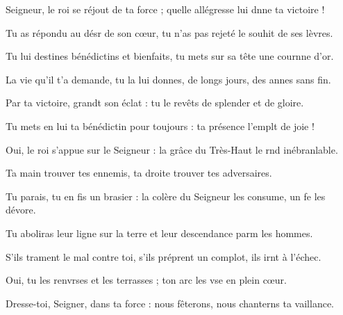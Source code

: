 \item Seigneur, le roi se réjout de ta force ;\psstar{} quelle allégresse lui dnne ta victoire !
\item Tu as répondu au désr de son cœur,\psstar{} tu n’as pas rejeté le souhit de ses lèvres.
\item Tu lui destines bénédictins et bienfaits,\psstar{} tu mets sur sa tête une cournne d’or.
\item La vie qu’il t’a demande, tu la lui donnes,\psstar{} de longs jours, des annes sans fin.
\item Par ta victoire, grandt son éclat :\psstar{} tu le revêts de splender et de gloire.
\item Tu mets en lui ta bénédictin pour toujours :\psstar{} ta présence l’emplt de joie !
\item Oui, le roi s’appue sur le Seigneur :\psstar{} la grâce du Très-Haut le rnd inébranlable.
\item Ta main trouver tes ennemis,\psstar{} ta droite trouver tes adversaires.
\item Tu parais, tu en fis un brasier :\psstar{} la colère du Seigneur les consume, un fe les dévore.
\item Tu aboliras leur ligne sur la terre\psstar{} et leur descendance parm les hommes.
\item S’ils trament le mal contre toi, s’ils préprent un complot,\psstar{} ils irnt à l’échec.
\item Oui, tu les renvrses et les terrasses ;\psstar{} ton arc les vse en plein cœur.
\item Dresse-toi, Seigner, dans ta force :\psstar{} nous fêterons, nous chanterns ta vaillance.